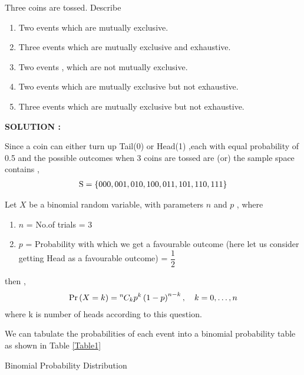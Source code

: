 \documentclass[journal,12pt,twocolumn]{IEEEtran}
\begin{document}
Three coins are tossed. Describe 
\begin{enumerate}[label=(\roman{enumi})]
    \item Two events which are mutually exclusive.
    \item Three events which are mutually exclusive and exhaustive.
    \item Two events , which are not mutually exclusive.
    \item Two events which are mutually exclusive but not exhaustive.
    \item Three events which are mutually exclusive but not exhaustive.
\end{enumerate}

\textbf{SOLUTION :}

Since a coin can either turn up Tail(0) or Head(1) ,each with equal probability of 0.5 and the possible outcomes when 3 coins are tossed are (or) the sample space contains ,
\begin{align}
	\text{S} = \left\{000,001,010,100,011,101,110,111\right\}
\end{align}

Let $X$ be a binomial random variable, with parameters $n$ and $p$ , where
\begin{enumerate}
    \item $n$ = No.of trials = 3
    \item $p$ = Probability with which we get a favourable outcome (here let us consider getting Head as a favourable outcome) = $\dfrac{1}{2}$
\end{enumerate}
then ,
\begin{align}
    \Pr\left(X = k\right) = {{}^{n}\mkern-1muC_{k}} p^k\left(1-p\right)^{n-k}, \quad k = 0,\dots, n
\end{align}
where k is number of heads according to this question.

We can tabulate the probabilities of each event into a binomial probability table as shown in Table \ref{Table1}
\begin{table}[ht!]
\def\arraystretch{1.75}
        
        \caption{Binomial Probability Distribution}
        \label{Table1}
    \end{table}
\end{document}

